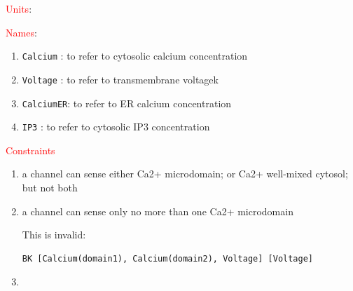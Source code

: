 \textcolor{red}{Units}: 


\textcolor{red}{Names}:
\begin{enumerate}
  \item \verb!Calcium! : to refer to cytosolic calcium concentration
  \item \verb!Voltage! : to refer to transmembrane voltagek
  \item \verb!CalciumER!: to refer to ER calcium concentration
  
  \item \verb!IP3! : to refer to cytosolic IP3 concentration 
\end{enumerate}

\textcolor{red}{Constraints}
\begin{enumerate}
  \item a channel can sense either Ca2+ microdomain; or Ca2+ well-mixed
  cytosol; but not both
  
  \item a channel can sense only no more than one Ca2+ microdomain

This is invalid:
\begin{verbatim}
BK [Calcium(domain1), Calcium(domain2), Voltage] [Voltage]
\end{verbatim}


  \item 
\end{enumerate}

